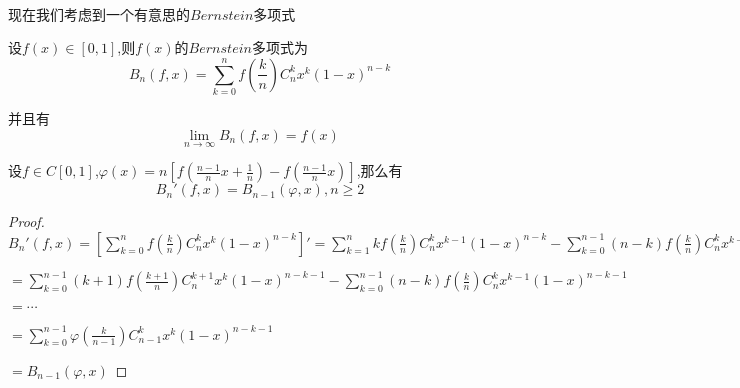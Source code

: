 \documentclass[lang=cn,10pt]{elegantbook}
\begin{document}
	~\\
	
	~\\
	~\\
	~\\
	~\\
	~\\
	~\\
	~\\
	
	现在我们考虑到一个有意思的$Bernstein$多项式
	\begin{definition}
		设$f(x)\in [0,1]$,则$f(x)$的$Bernstein$多项式为
		\begin{equation*}
			B_n\left( f,x \right) =\sum_{k=0}^n{f\left( \frac{k}{n} \right) C_{n}^{k}x^k\left( 1-x \right) ^{n-k}}
		\end{equation*}
		
		并且有
		\begin{equation*}
			\lim_{n\rightarrow \infty} B_n\left( f,x \right) =f\left( x \right) 
		\end{equation*}
	\end{definition}
	\begin{lemma}
		设$f$$\in$$C[0,1]$,$\varphi \left( x \right) =n\left[ f\left( \frac{n-1}{n}x+\frac{1}{n} \right) -f\left( \frac{n-1}{n}x \right) \right] $,那么有
		\begin{equation*}
			B_{n}'\left( f,x \right) =B_{n-1}\left( \varphi ,x \right) ,n\ge 2
		\end{equation*}
	\end{lemma}
	\begin{proof}
		
		$B_{n}'\left( f,x \right) =\left[ \sum_{k=0}^n{f\left( \frac{k}{n} \right) C_{n}^{k}x^k\left( 1-x \right) ^{n-k}} \right] '=\sum_{k=1}^n{kf\left( \frac{k}{n} \right) C_{n}^{k}x^{k-1}\left( 1-x \right) ^{n-k}}-\sum_{k=0}^{n-1}{\left( n-k \right) f\left( \frac{k}{n} \right) C_{n}^{k}x^{k-1}\left( 1-x \right) ^{n-k-1}}
		$
		
		$
		=\sum_{k=0}^{n-1}{\left( k+1 \right) f\left( \frac{k+1}{n} \right) C_{n}^{k+1}x^k\left( 1-x \right) ^{n-k-1}}-\sum_{k=0}^{n-1}{\left( n-k \right) f\left( \frac{k}{n} \right) C_{n}^{k}x^{k-1}\left( 1-x \right) ^{n-k-1}}
		$
		
		
		$=\cdots$ 
		
		$=\sum_{k=0}^{n-1}{\varphi \left( \frac{k}{n-1} \right) C_{n-1}^{k}x^k\left( 1-x \right) ^{n-k-1}}$
		
		
		$=B_{n-1}\left( \varphi ,x \right) $
	\end{proof}
\end{document}
